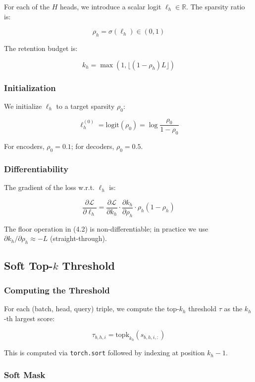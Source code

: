 For each of the $H$ heads, we introduce a scalar logit $\ell_h \in \mathbb{R}$. 
The sparsity ratio is:

\[
\rho_h = \sigma(\ell_h) \in (0, 1)
\]

The retention budget is:

\[
k_h = \max(1, \lfloor (1 - \rho_h) L \rfloor)
\]

\subsubsection{Initialization}

We initialize $\ell_h$ to a target sparsity $\rho_0$:

\[
\ell_h^{(0)} = \text{logit}(\rho_0) = \log \frac{\rho_0}{1 - \rho_0}
\]

For encoders, $\rho_0 = 0.1$; for decoders, $\rho_0 = 0.5$.

\subsubsection{Differentiability}

The gradient of the loss w.r.t. $\ell_h$ is:

\[
\frac{\partial \mathcal{L}}{\partial \ell_h} = \frac{\partial \mathcal{L}}{\partial k_h} \cdot \frac{\partial k_h}{\partial \rho_h} \cdot \rho_h (1 - \rho_h)
\]

The floor operation in (4.2) is non-differentiable; in practice we use 
$\partial k_h / \partial \rho_h \approx -L$ (straight-through).

\subsection{Soft Top-$k$ Threshold}

\subsubsection{Computing the Threshold}

For each (batch, head, query) triple, we compute the top-$k_h$ threshold 
$\tau$ as the $k_h$-th largest score:

\[
\tau_{b, h, i} = \text{topk}_{k_h}(s_{b, h, i, :})
\]

This is computed via \texttt{torch.sort} followed by indexing at position $k_h - 1$.

\subsubsection{Soft Mask}

